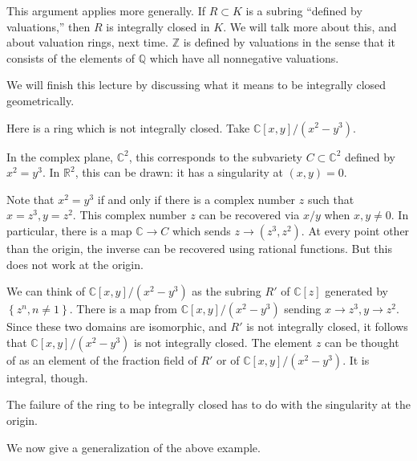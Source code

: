 This argument applies more generally. If $R \subset K$ is a subring ``defined
by valuations,'' then $R$ is integrally closed in $K$.  We will talk more about
this, and about valuation rings, next time.
$\mathbb{Z}$ is defined by valuations in the sense that it consists of the
elements of $\mathbb{Q}$ which have all nonnegative valuations.

We will finish this lecture by discussing what it means to be integrally closed
geometrically.

\begin{example}
Here is a ring which is not integrally closed. Take  $\mathbb{C}[x, y]/(x^2
- y^3)$.

In the complex plane, $\mathbb{C}^2$, this corresponds to the subvariety $C
\subset \mathbb{C}^2$ defined by $x^2 =
y^3$.  In $\mathbb{R}^2$, this can be drawn: it has a singularity at $(x,y)=0$.

Note that $x^2 = y^3$ if and only if there is a complex number $z$ such that $x
= z^3, y = z^2$. This complex number $z$ can be recovered via $x/y$ when $x,y
\neq 0$. In particular, there is a map $\mathbb{C} \to C$ which sends $z \to
(z^3, z^2)$.  At every point other than the origin, the inverse can be
recovered using rational functions. But this does not work at the origin.

We can think of $\mathbb{C}[x,y]/(x^2 - y^3)$ as the subring $R'$ of
$\mathbb{C}[z]$
generated by $\left\{z^n, n \neq 1\right\}$.  There is a map from
$\mathbb{C}[x,y]/(x^2 - y^3)$ sending $x \to z^3, y \to z^2$.  Since these two
domains are isomorphic, and $R'$ is not integrally closed, it follows that
$\mathbb{C}[x,y]/(x^2 - y^3)$ is not integrally closed.
The element $z$ can be thought of as an element of the fraction field of $R'$
or of $\mathbb{C}[x,y]/(x^2 - y^3)$.
It is integral, though.

The failure of the ring to be integrally closed has to do with the singularity
at the
origin.
\end{example}


We now give a generalization of the above example.

